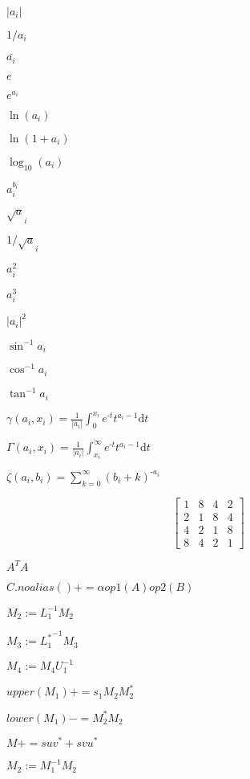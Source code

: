 \documentclass{article}
\begin{document}
$ |a_i| $
\pagebreak

$ 1/a_i $
\pagebreak

$ \bar{a_i} $
\pagebreak

$ e $
\pagebreak

$ e^{a_i} $
\pagebreak

$ \ln({a_i}) $
\pagebreak

$ \ln({1+a_i}) $
\pagebreak

$ \log_{10}({a_i}) $
\pagebreak

$ a_i ^ {b_i} $
\pagebreak

$ \sqrt a_i $
\pagebreak

$ 1/{\sqrt a_i} $
\pagebreak

$ a_i^2 $
\pagebreak

$ a_i^3 $
\pagebreak

$ |a_i|^2 $
\pagebreak

$ \sin^{-1} a_i $
\pagebreak

$ \cos^{-1} a_i $
\pagebreak

$ \tan^{-1} a_i $
\pagebreak

$ \gamma(a_i,x_i)= \frac{1}{|a_i|} \int_{0}^{x_i}e^{\text{-}t} t^{a_i-1} \mathrm{d} t $
\pagebreak

$ \Gamma(a_i,x_i) = \frac{1}{|a_i|} \int_{x_i}^{\infty}e^{\text{-}t} t^{a_i-1} \mathrm{d} t $
\pagebreak

$ \zeta(a_i,b_i)=\sum_{k=0}^{\infty}(b_i+k)^{\text{-}a_i} $
\pagebreak

\[ \begin{bmatrix} 1 & 8 & 4 & 2 \\ 2 & 1 & 8 & 4 \\ 4 & 2 & 1 & 8 \\ 8 & 4 & 2 & 1 \end{bmatrix} \]
\pagebreak

$ A^T A $
\pagebreak

$ C.noalias() += \alpha op1(A) op2(B) $
\pagebreak

$ M_2 := L_1^{-1} M_2 $
\pagebreak

$ M_3 := {L_1^*}^{-1} M_3 $
\pagebreak

$ M_4 := M_4 U_1^{-1} $
\pagebreak

$ upper(M_1) \mathrel{{+}{=}} s_1 M_2 M_2^* $
\pagebreak

$ lower(M_1) \mathbin{{-}{=}} M_2^* M_2 $
\pagebreak

$ M \mathrel{{+}{=}} s u v^* + s v u^* $
\pagebreak

$ M_2 := M_1^{-1} M_2 $
\pagebreak
\end{document}
